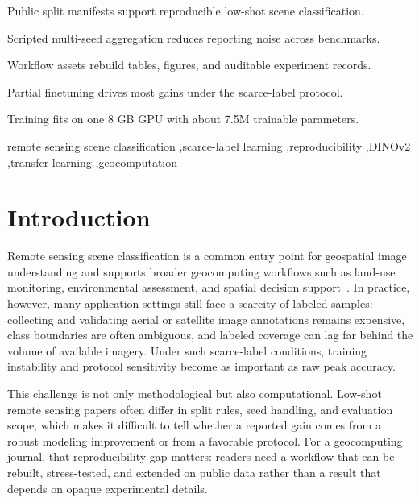 \documentclass[a4paper,fleqn]{cas-sc}
\begin{document}
\begin{highlights}
\item Public split manifests support reproducible low-shot scene classification.
\item Scripted multi-seed aggregation reduces reporting noise across benchmarks.
\item Workflow assets rebuild tables, figures, and auditable experiment records.
\item Partial finetuning drives most gains under the scarce-label protocol.
\item Training fits on one 8 GB GPU with about 7.5M trainable parameters.
\end{highlights}

\begin{keywords}
remote sensing scene classification \sep scarce-label learning \sep reproducibility \sep DINOv2 \sep transfer learning \sep geocomputation
\end{keywords}

\maketitle

\printcredits

\doublespacing
\modulolinenumbers[5]
\linenumbers

\section{Introduction}

Remote sensing scene classification is a common entry point for geospatial image understanding and supports broader geocomputing workflows such as land-use monitoring, environmental assessment, and spatial decision support~\cite{cheng2017survey,thapa2023review}. In practice, however, many application settings still face a scarcity of labeled samples: collecting and validating aerial or satellite image annotations remains expensive, class boundaries are often ambiguous, and labeled coverage can lag far behind the volume of available imagery. Under such scarce-label conditions, training instability and protocol sensitivity become as important as raw peak accuracy.

This challenge is not only methodological but also computational. Low-shot remote sensing papers often differ in split rules, seed handling, and evaluation scope, which makes it difficult to tell whether a reported gain comes from a robust modeling improvement or from a favorable protocol. For a geocomputing journal, that reproducibility gap matters: readers need a workflow that can be rebuilt, stress-tested, and extended on public data rather than a result that depends on opaque experimental details.
\end{document}

